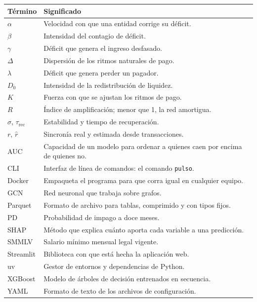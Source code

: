 \begin{longtable}{L{0.24\textwidth}L{0.7\textwidth}}
\toprule
\textbf{Término} & \textbf{Significado} \\
\midrule
\endhead
$\alpha$ & Velocidad con que una entidad corrige su déficit. \\
$\beta$ & Intensidad del contagio de déficit. \\
$\gamma$ & Déficit que genera el ingreso desfasado. \\
$\Delta$ & Dispersión de los ritmos naturales de pago. \\
$\lambda$ & Déficit que genera perder un pagador. \\
$D_0$ & Intensidad de la redistribución de liquidez. \\
$K$ & Fuerza con que se ajustan los ritmos de pago. \\
$R$ & Índice de amplificación; menor que 1, la red amortigua. \\
$\sigma$, $\tau_\text{rec}$ & Estabilidad y tiempo de recuperación. \\
$r$, $\hat r$ & Sincronía real y estimada desde transacciones. \\
AUC & Capacidad de un modelo para ordenar a quienes caen por encima de quienes no. \\
CLI & Interfaz de línea de comandos: el comando \texttt{pulso}. \\
Docker & Empaqueta el programa para que corra igual en cualquier equipo. \\
GCN & Red neuronal que trabaja sobre grafos. \\
Parquet & Formato de archivo para tablas, comprimido y con tipos fijos. \\
PD & Probabilidad de impago a doce meses. \\
SHAP & Método que explica cuánto aporta cada variable a una predicción. \\
SMMLV & Salario mínimo mensual legal vigente. \\
Streamlit & Biblioteca con que está hecha la aplicación web. \\
uv & Gestor de entornos y dependencias de Python. \\
XGBoost & Modelo de árboles de decisión entrenados en secuencia. \\
YAML & Formato de texto de los archivos de configuración. \\
\bottomrule
\end{longtable}
